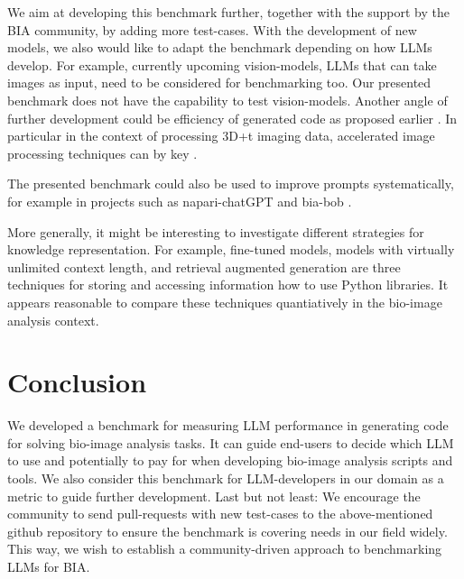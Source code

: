 \documentclass{ecai}
\begin{document}
We aim at developing this benchmark further, together with the support by the BIA community, by adding more test-cases. With the development of new models, we also would like to adapt the benchmark depending on how LLMs develop. For example, currently upcoming vision-models, LLMs that can take images as input, need to be considered for benchmarking too. Our presented  benchmark does not have the capability to test vision-models. Another angle of further development could be efficiency of generated code as proposed earlier \citep{du2024mercury}. In particular in the context of processing 3D+t imaging data, accelerated image processing techniques can by key \citep{Haase2020}. 
\begin{blind}
The presented benchmark could also be used to improve prompts systematically, for example in projects such as napari-chatGPT \citep{royer2023omega} and bia-bob \citep{haase2024biaBob}.
\end{blind} 
More generally, it might be interesting to investigate different strategies for knowledge representation. For example, fine-tuned models, models with virtually unlimited context length, and retrieval augmented generation are three techniques for storing and accessing information how to use Python libraries. It appears reasonable to compare these techniques quantiatively in the bio-image analysis context.


\section{Conclusion}

We developed a benchmark for measuring LLM performance in generating code for solving bio-image analysis tasks. It can guide end-users to decide which LLM to use and potentially to pay for when developing bio-image analysis scripts and tools. We also consider this benchmark for LLM-developers in our domain as a metric to guide further development. Last but not least: We encourage the community to send pull-requests with new test-cases to the above-mentioned github repository to ensure the benchmark is covering needs in our field widely. This way, we wish to establish a community-driven approach to benchmarking LLMs for BIA. 



\end{document}
